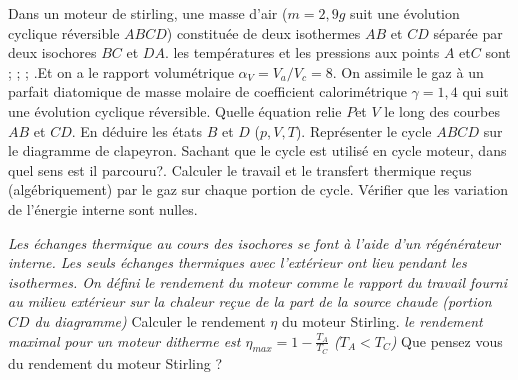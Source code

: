 \begin{Exercise}[title=Cycle de Stirling moteur]
		Dans un moteur de stirling, une masse d'air ($m=2,9g$ suit une évolution cyclique réversible $ABCD$) constituée de deux isothermes $AB$ et $CD$ séparée par deux isochores $BC$ et $DA$. les températures et les pressions aux points $A$ et$C$ sont ; ;  ; .Et on a le rapport volumétrique $\alpha_V = V_a /V_c  = 8$. On assimile le gaz à un parfait diatomique de masse molaire  de coefficient calorimétrique $\gamma= 1,4$ qui suit une évolution cyclique réversible.
		\Question Quelle équation relie $P$et $V$ le long des courbes $AB$ et $CD$. En déduire les états $B$ et $D$ ($p,V,T$).
		\Question Représenter le cycle $ABCD$ sur le diagramme de clapeyron.
		\Question Sachant que le cycle est utilisé en cycle moteur, dans quel sens est il parcouru?.
		\Question Calculer le travail et le transfert thermique reçus (algébriquement) par le gaz sur chaque portion de cycle.
		\Question Vérifier que les variation de l'énergie interne sont nulles.

		\emph{ Les échanges thermique au cours des isochores se font à l'aide d'un régénérateur interne. Les seuls échanges thermiques avec l'extérieur ont lieu pendant les isothermes. On défini le rendement du moteur comme le rapport du travail fourni au milieu extérieur sur la chaleur reçue de la part de la source chaude (portion $CD$ du diagramme)}
		\Question Calculer le rendement $\eta$ du moteur Stirling.
		\emph{le rendement maximal pour un moteur ditherme est $\eta_{max}=1-\frac{T_A}{T_C}$ ($T_A< T_C$)}
		\Question Que pensez vous du rendement du moteur Stirling ?
\end{Exercise}
